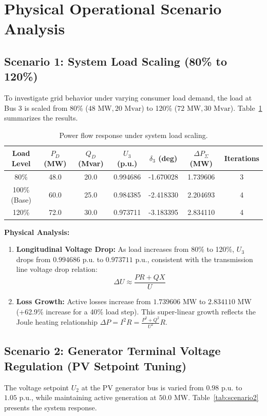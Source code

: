 \documentclass[12pt,a4paper,oneside]{report}
\begin{document}
\section{Physical Operational Scenario Analysis}

\subsection{Scenario 1: System Load Scaling (80\% to 120\%)}
To investigate grid behavior under varying consumer load demand, the load at Bus 3 is scaled from 80\% ($48\text{ MW}, 20\text{ Mvar}$) to 120\% ($72\text{ MW}, 30\text{ Mvar}$). Table~\ref{tab:scenario1} summarizes the results.

\begin{table}[H]
\centering
\caption{Power flow response under system load scaling.}
\label{tab:scenario1}
\begin{tabular}{ccccccc}
\toprule
\textbf{Load Level} & \textbf{$P_D$ (MW)} & \textbf{$Q_D$ (Mvar)} & \textbf{$U_3$ (p.u.)} & \textbf{$\delta_3$ (deg)} & \textbf{$\Delta P_{\Sigma}$ (MW)} & \textbf{Iterations} \\
\midrule
80\% & 48.0 & 20.0 & 0.994686 & -1.670028 & 1.739606 & 3 \\
100\% (Base) & 60.0 & 25.0 & 0.984385 & -2.418330 & 2.204693 & 4 \\
120\% & 72.0 & 30.0 & 0.973711 & -3.183395 & 2.834110 & 4 \\
\bottomrule
\end{tabular}
\end{table}

\textbf{Physical Analysis:}
\begin{enumerate}
    \item \textbf{Longitudinal Voltage Drop:} As load increases from 80\% to 120\%, $U_3$ drops from $0.994686\text{ p.u.}$ to $0.973711\text{ p.u.}$, consistent with the transmission line voltage drop relation:
    \begin{equation}
    \Delta U \approx \frac{P R + Q X}{U}
    \end{equation}
    \item \textbf{Loss Growth:} Active losses increase from $1.739606\text{ MW}$ to $2.834110\text{ MW}$ (+62.9\% increase for a 40\% load step). This super-linear growth reflects the Joule heating relationship $\Delta P = I^2 R = \frac{P^2 + Q^2}{U^2} R$.
\end{enumerate}

\subsection{Scenario 2: Generator Terminal Voltage Regulation (PV Setpoint Tuning)}
The voltage setpoint $U_2$ at the PV generator bus is varied from $0.98\text{ p.u.}$ to $1.05\text{ p.u.}$, while maintaining active generation at $50.0\text{ MW}$. Table~\ref{tab:scenario2} presents the system response.
\end{document}
